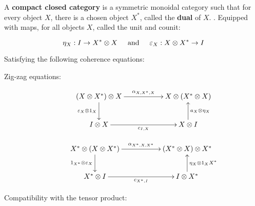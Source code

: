 \begin{definition}
A {\bf compact closed category} is a symmetric monoidal category such that for every object $X$, there is a chosen object $X^*$, called the {\bf dual} of $X$.
. Equipped with maps, for all objects $X$, called the unit and counit:

$$
\eta_X:I\to X^* \otimes X\hspace*{.5cm}\text{and}\hspace*{.5cm} \epsilon_X:X\otimes X^*\to I 
$$



Satisfying the following coherence equations:

\begin{description}
\item[Zig-zag equations:]
$$
\xymatrix{
  (X\otimes X^*)\otimes X \ar[rr]^{\alpha_{X,X^*,X}}  \ar[d]_{\epsilon_X\otimes 1_X}
    & 
    & X\otimes(X^*\otimes X)
  \\I\otimes X \ar[rr]_{c_{I,X}}
    &
    & X\otimes I \ar[u]_{a_X\otimes \eta_X}
}
$$

$$
\xymatrix{
  X^*\otimes ( X\otimes X^*) \ar[rr]^{\alpha_{X^*,X,X^*}}  \ar[d]_{1_{X^*}\otimes \epsilon_X}
    & 
    & (X^* \otimes X)\otimes X^*
  \\X^*\otimes I \ar[rr]_{c_{X^*,I}}
    &
    & I\otimes X^* \ar[u]_{\eta_X\otimes 1_X{X^*}}
}
$$


\item[Compatibility with the tensor product:]\


\end{description}
\end{definition}
